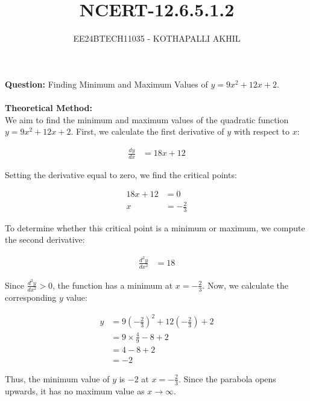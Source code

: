 \documentclass[article]{IEEEtran}
\numberwithin{figure}{enumi}
\begin{document}

\title{NCERT-12.6.5.1.2}
\author{EE24BTECH11035 - KOTHAPALLI AKHIL}
{\let\newpage\relax\maketitle}
\noindent\textbf{Question: }  
Finding Minimum and Maximum Values of $y = 9x^2 + 12x + 2$.\\
\solution \\
\textbf{Theoretical Method:}\\
We aim to find the minimum and maximum values of the quadratic function $y = 9x^2 + 12x + 2$. First, we calculate the first derivative of $y$ with respect to $x$:

\begin{align}
\frac{dy}{dx} &= 18x + 12
\end{align}

Setting the derivative equal to zero, we find the critical points:

\begin{align}
18x + 12 &= 0 \\
x &= -\frac{2}{3}
\end{align}

To determine whether this critical point is a minimum or maximum, we compute the second derivative:

\begin{align}
\frac{d^2y}{dx^2} &= 18
\end{align}

Since $\frac{d^2y}{dx^2} > 0$, the function has a minimum at $x = -\frac{2}{3}$. Now, we calculate the corresponding $y$ value:

\begin{align}
y &= 9\left(-\frac{2}{3}\right)^2 + 12\left(-\frac{2}{3}\right) + 2 \\
&= 9 \times \frac{4}{9} - 8 + 2 \\
&= 4 - 8 + 2 \\
&= -2
\end{align}

Thus, the minimum value of $y$ is $-2$ at $x = -\frac{2}{3}$. Since the parabola opens upwards, it has no maximum value as $x \to \infty$.
\end{document}
